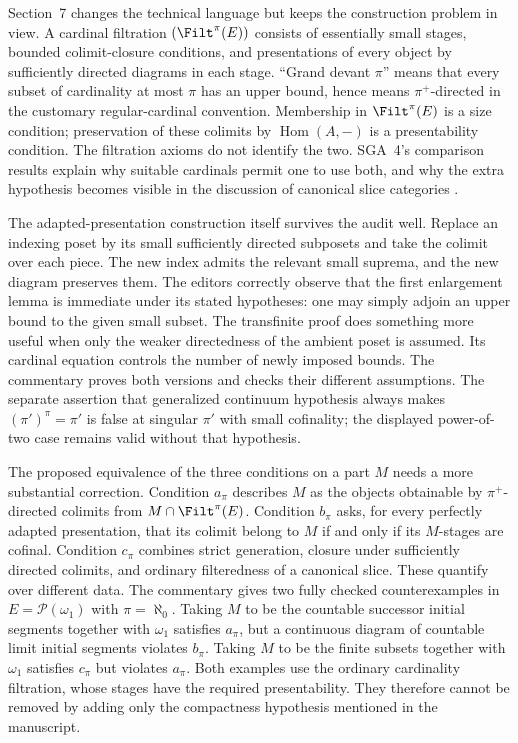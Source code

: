 Section~7 changes the technical language but keeps the construction problem in view. A cardinal filtration $(\Filt^\pi(E))$ consists of essentially small stages, bounded colimit-closure conditions, and presentations of every object by sufficiently directed diagrams in each stage. ``Grand devant $\pi$'' means that every subset of cardinality at most $\pi$ has an upper bound, hence means $\pi^+$-directed in the customary regular-cardinal convention. Membership in $\Filt^\pi(E)$ is a size condition; preservation of these colimits by $\operatorname{Hom}(A,-)$ is a presentability condition. The filtration axioms do not identify the two. SGA~4's comparison results explain why suitable cardinals permit one to use both, and why the extra hypothesis becomes visible in the discussion of canonical slice categories \citep[I, 9.12 and 9.16--9.18]{SGA4I1972}.

The adapted-presentation construction itself survives the audit well. Replace an indexing poset by its small sufficiently directed subposets and take the colimit over each piece. The new index admits the relevant small suprema, and the new diagram preserves them. The editors correctly observe that the first enlargement lemma is immediate under its stated hypotheses: one may simply adjoin an upper bound to the given small subset. The transfinite proof does something more useful when only the weaker directedness of the ambient poset is assumed. Its cardinal equation controls the number of newly imposed bounds. The commentary proves both versions and checks their different assumptions. The separate assertion that generalized continuum hypothesis always makes $(\pi')^\pi=\pi'$ is false at singular $\pi'$ with small cofinality; the displayed power-of-two case remains valid without that hypothesis.

The proposed equivalence of the three conditions on a part $M$ needs a more substantial correction. Condition $a_\pi$ describes $M$ as the objects obtainable by $\pi^+$-directed colimits from $M\cap\Filt^\pi(E)$. Condition $b_\pi$ asks, for every perfectly adapted presentation, that its colimit belong to $M$ if and only if its $M$-stages are cofinal. Condition $c_\pi$ combines strict generation, closure under sufficiently directed colimits, and ordinary filteredness of a canonical slice. These quantify over different data. The commentary gives two fully checked counterexamples in $E=\mathcal P(\omega_1)$ with $\pi=\aleph_0$. Taking $M$ to be the countable successor initial segments together with $\omega_1$ satisfies $a_\pi$, but a continuous diagram of countable limit initial segments violates $b_\pi$. Taking $M$ to be the finite subsets together with $\omega_1$ satisfies $c_\pi$ but violates $a_\pi$. Both examples use the ordinary cardinality filtration, whose stages have the required presentability. They therefore cannot be removed by adding only the compactness hypothesis mentioned in the manuscript.

